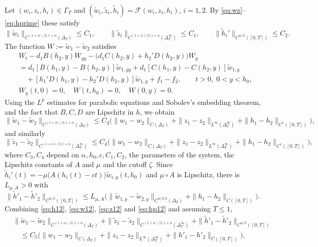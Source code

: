 \documentclass[reqno]{amsart}
\theoremstyle{plain}
\theoremstyle{definition}
\theoremstyle{remark}
\begin{document}
Let $(w_i,z_i,h_i)\in\Gamma_T$ and
$(\tilde w_i,\tilde z_i,\tilde h_i)=\mathcal F(w_i,z_i,h_i)$, $i=1,2$. By
\eqref{eq:wz}--\eqref{eq:hprime} these satisfy
\[
\|\tilde{w}_i \|_{C^{(1 + \alpha)/2, 1 + \alpha}(\Delta_T)}\le C_1,
\qquad
\|\tilde{z}_i \|_{C^{(1 + \alpha)/2, 1 + \alpha}(\Delta_T^\infty)}\le C_1,
\qquad
\|\tilde{h}_i' \|_{C^{\alpha/2}([0,T])}\le C_2 .
\]
The function
$W := \tilde{w}_1 - \tilde{w}_2$ satisfies
\[
\begin{aligned}
	& W_t - d_1 B(h_2, y) W_{yy} - \big(d_1C(h_2, y) + h_2' D(h_2, y) \big)W_y \\
	& = d_1[B(h_1, y) - B(h_2, y)] \tilde{w}_{1,yy} + d_1[C(h_1, y) - C(h_2, y) ] \tilde{w}_{1,y} \\
	& \quad + [h_1' D(h_1, y) - h_2' D(h_2, y)]\tilde{w}_{1,y} + f_1 - f_2, \qquad t > 0, \; 0 < y < h_0, \\
	& W_y(t,0) = 0, \quad W(t, h_0) = 0, \quad W(0, y) = 0 .
\end{aligned}
\]
Using the $L^p$ estimates for parabolic equations and Sobolev's embedding
theorem, and the fact that $B,C,D$ are Lipschitz in $h$, we obtain
\begin{equation}\label{eq:w12}
	\|\tilde{w}_1 - \tilde{w}_2 \|_{C^{(1 + \alpha)/2, 1 + \alpha}(\Delta_T)}
	\le C_3 \big(\|w_1 - w_2\|_{C(\Delta_T)} +\|z_1 - z_2\|_{L^\infty(\Delta_T^\infty)}   +\|h_1 - h_2\|_{C^1([0,T])} \big),
\end{equation}
and similarly
\begin{equation}\label{eq:z12}
	\|\tilde{z}_1 - \tilde{z}_2\|_{C^{(1+\alpha)/2, 1+\alpha}(\Delta_T^\infty)}
	\le C_4 \big(\|w_1 - w_2\|_{C(\Delta_T)} + \|z_1 - z_2\|_{L^\infty(\Delta_T^\infty)} + \|h_1 - h_2\|_{C^1([0,T])}\big),
\end{equation}
where $C_3,C_4$ depend on $\alpha, h_0, c, C_1, C_2$, the parameters of the
system, the Lipschitz constants of $A$ and $\mu$ and the cutoff $\zeta$. Since
$\tilde h_i'(t)=-\mu\big(A(h_i(t)-ct)\big)\tilde w_{i,y}(t,h_0)$ and
$\mu\circ A$ is Lipschitz, there is $L_{\mu,A}>0$ with
\begin{equation}\label{eq:hp12}
	\|\tilde{h}'_1 - \tilde{h}'_2\|_{C^{\alpha/2}([0,T])}
	\le L_{\mu,A} \big( \|\tilde{w}_{1,y} - \tilde{w}_{2,y}\|_{C^{\alpha/2,0}(\Delta_T)}
	+ \|h_1 - h_2\|_{C([0,T])}\big).
\end{equation}
Combining \eqref{eq:h12}, \eqref{eq:w12}, \eqref{eq:z12} and \eqref{eq:hp12} and
assuming $T\le1$,
\[
\begin{aligned}
	& \|\tilde{w}_1 - \tilde{w}_2\|_{C^{(1+\alpha)/2, 1+\alpha}(\Delta_T)} + \|\tilde{z}_1 - \tilde{z}_2\|_{C^{(1+\alpha)/2, 1+\alpha}(\Delta_T^\infty)} + \|\tilde{h}'_1 - \tilde{h}'_2\|_{C^{\alpha/2}([0,T])} \\
	& \quad \le C_5 \big(\|w_1 - w_2\|_{C(\Delta_T)} + \|z_1 - z_2\|_{L^\infty(\Delta_T^\infty)} + \|h'_1 - h'_2\|_{C([0,T])}\big),
\end{aligned}
\]
\end{document}

